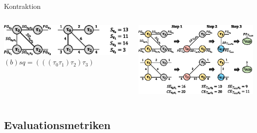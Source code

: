 \documentclass{beamer}
\begin{document}
\begin{frame}{Kontraktion}
	\begin{columns}
		\begin{column}{0.5\textwidth}
			\includegraphics[scale=.17]{figure_03_a}
			$(b) sq=(((\tau_0\tau_1)\tau_2)\tau_3)$
		\end{column}
		\begin{column}{0.5\textwidth}
			\includegraphics[scale=.17]{figure_03_b}
		\end{column}
	\end{columns}
\end{frame}

\subsection{Evaluationsmetriken}
\end{document}
